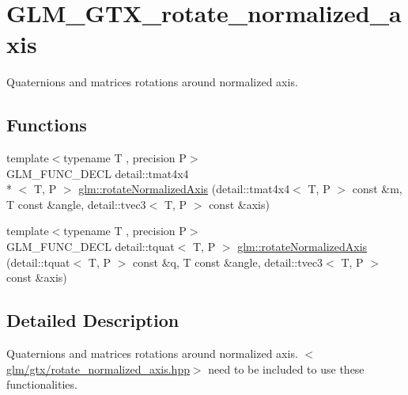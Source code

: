 \hypertarget{group__gtx__rotate__normalized__axis}{\section{G\-L\-M\-\_\-\-G\-T\-X\-\_\-rotate\-\_\-normalized\-\_\-axis}
\label{group__gtx__rotate__normalized__axis}
}


Quaternions and matrices rotations around normalized axis.  


\subsection*{Functions}
\begin{DoxyCompactItemize}
\item 
{\footnotesize template$<$typename T , precision P$>$ }\\G\-L\-M\-\_\-\-F\-U\-N\-C\-\_\-\-D\-E\-C\-L detail\-::tmat4x4\\*
$<$ T, P $>$ \hyperlink{group__gtx__rotate__normalized__axis_gac47b4efcecdaf7e892b10ae89135c544}{glm\-::rotate\-Normalized\-Axis} (detail\-::tmat4x4$<$ T, P $>$ const \&m, T const \&angle, detail\-::tvec3$<$ T, P $>$ const \&axis)
\item 
{\footnotesize template$<$typename T , precision P$>$ }\\G\-L\-M\-\_\-\-F\-U\-N\-C\-\_\-\-D\-E\-C\-L detail\-::tquat$<$ T, P $>$ \hyperlink{group__gtx__rotate__normalized__axis_ga774f0f09fc99b3a967001cb116aa7f2a}{glm\-::rotate\-Normalized\-Axis} (detail\-::tquat$<$ T, P $>$ const \&q, T const \&angle, detail\-::tvec3$<$ T, P $>$ const \&axis)
\end{DoxyCompactItemize}


\subsection{Detailed Description}
Quaternions and matrices rotations around normalized axis. $<$\hyperlink{rotate__normalized__axis_8hpp}{glm/gtx/rotate\-\_\-normalized\-\_\-axis.\-hpp}$>$ need to be included to use these functionalities. 

